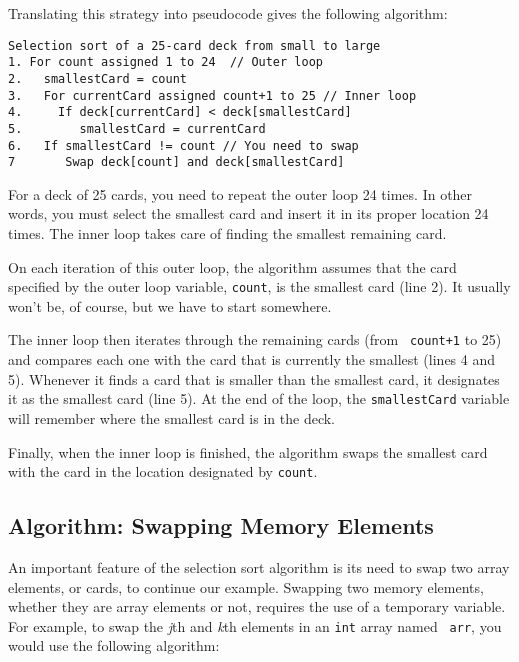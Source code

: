 Translating this strategy into pseudocode gives the following
\mbox{algorithm:}

\begin{jjjlisting}
\begin{lstlisting}
Selection sort of a 25-card deck from small to large
1. For count assigned 1 to 24  // Outer loop
2.   smallestCard = count
3.   For currentCard assigned count+1 to 25 // Inner loop
4.     If deck[currentCard] < deck[smallestCard]
5.        smallestCard = currentCard
6.   If smallestCard != count // You need to swap
7       Swap deck[count] and deck[smallestCard]
\end{lstlisting}
\end{jjjlisting}

\noindent For a deck of 25 cards, you need to repeat the outer loop
24 times.  In other words, you must select the smallest
card and insert it in its proper location 24 times.  The inner loop
takes care of finding the smallest remaining card.

On each iteration of this outer loop, the algorithm assumes that the
card specified by the outer loop variable, {\tt count}, is the
smallest card (line 2). It usually won't be, of course, but we have
to start somewhere.

The inner loop then iterates through the remaining cards (from {\tt
count+1} to 25) and compares each one with the card that is currently
the smallest (lines 4 and 5). Whenever it finds a card that is smaller
than the smallest card, it designates it as the smallest card (line
5). At the end of the loop, the {\tt smallestCard} variable will
remember where the smallest card is in the deck.

Finally, when the inner loop is finished, the algorithm swaps the
smallest card with the card in the location designated by {\tt count}.

\subsection{Algorithm: Swapping Memory Elements}

\noindent An important feature of the selection sort algorithm is its
need to swap two array elements, or cards, to continue our
example. Swapping two memory elements, whether they are array elements
or not, requires the use of a temporary variable. For example, to swap
the {\em j}th and {\em k}th elements in an {\tt int} array named {\tt
arr}, you would use the following algorithm: 

